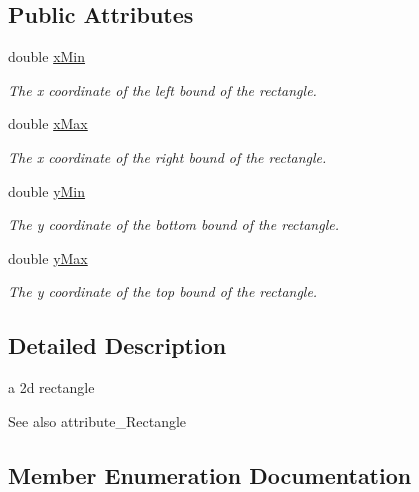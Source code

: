 \subsection*{Public Attributes}
\begin{DoxyCompactItemize}
\item 
double \hyperlink{classns3_1_1Rectangle_ad02246cec7de9b3eea3eb727dae274ac}{x\+Min}
\begin{DoxyCompactList}\small\item\em The x coordinate of the left bound of the rectangle. \end{DoxyCompactList}\item 
double \hyperlink{classns3_1_1Rectangle_a73a0b805e1b7dabfe6c867eb03203faa}{x\+Max}
\begin{DoxyCompactList}\small\item\em The x coordinate of the right bound of the rectangle. \end{DoxyCompactList}\item 
double \hyperlink{classns3_1_1Rectangle_afb85ffe9ede5c0c178e9ec2bde4e5a8e}{y\+Min}
\begin{DoxyCompactList}\small\item\em The y coordinate of the bottom bound of the rectangle. \end{DoxyCompactList}\item 
double \hyperlink{classns3_1_1Rectangle_a272ebb19702453c2fa7846b5c9c76b1c}{y\+Max}
\begin{DoxyCompactList}\small\item\em The y coordinate of the top bound of the rectangle. \end{DoxyCompactList}\end{DoxyCompactItemize}


\subsection{Detailed Description}
a 2d rectangle 

\begin{DoxySeeAlso}{See also}
attribute\+\_\+\+Rectangle 
\end{DoxySeeAlso}


\subsection{Member Enumeration Documentation}
